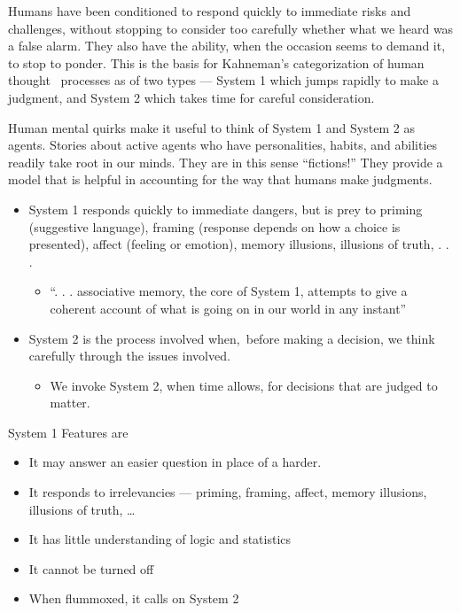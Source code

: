 \documentclass[
  10pt,
  b5paper]{book}
\providecommand{\tightlist}{%
  \setlength{\itemsep}{0pt}\setlength{\parskip}{0pt}}
\begin{document}
Humans have been conditioned to respond quickly to immediate
risks and challenges, without stopping to consider too carefully
whether what we heard was a false alarm. They also have the
ability, when the occasion seems to demand it, to stop to ponder.
This is the basis for Kahneman's categorization of human thought~
processes as of two types --- System 1 which jumps rapidly to
make a judgment, and System 2 which takes time for careful
consideration.

Human mental quirks make it useful to think of System 1 and System 2
as agents. Stories about active agents who have personalities, habits,
and abilities readily take root in our minds. They are in this sense
``fictions!'' They provide a model that is helpful in accounting for
the way that humans make judgments.

\begin{itemize}
\tightlist
\item
  System 1 responds quickly to immediate dangers, but is prey to
  priming (suggestive language), framing (response depends on how
  a choice is presented), affect (feeling or emotion),
  memory illusions, illusions of truth, . . .

  \begin{itemize}
  \tightlist
  \item
    ``. . . associative memory, the core of System 1, attempts to give a coherent
    account of what is going on in our world in any instant''
  \end{itemize}
\item
  System 2 is the process involved when,~before making a decision,
  we think carefully through the issues involved.

  \begin{itemize}
  \tightlist
  \item
    We invoke System 2, when time allows, for decisions that are judged to matter.
  \end{itemize}
\end{itemize}

System 1 Features are

\begin{itemize}
\tightlist
\item
  It may answer an easier question in place of a harder.
\item
  It responds to irrelevancies --- priming, framing, affect, memory illusions,
  illusions of truth, \ldots{}
\item
  It has little understanding of logic and statistics
\item
  It cannot be turned off
\item
  When flummoxed, it calls on System 2
\end{itemize}
\end{document}
